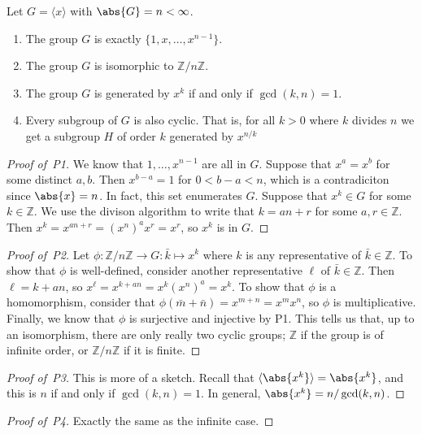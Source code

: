 \begin{proposition}
 Let $G = \langle x \rangle$ with $\abs{G} = n < \infty$.
 \begin{enumerate}[label=P\arabic*.]
 \item The group $G$ is exactly $\{1,x,\dotsc,x^{n-1}\}$.
 \item The group $G$ is isomorphic to $\mathbb{Z}/n\mathbb{Z}$.
 \item The group $G$ is generated by $x^k$ if and only if $\gcd(k,n) = 1$.
 \item Every subgroup of $G$ is also cyclic. That is, for all $k > 0$ where $k$ divides $n$ we get a subgroup $H$ of order $k$ generated by $x^{n/k}$
 \end{enumerate}
\end{proposition}
\begin{proof}[Proof of~P1]
We know that $1,\dotsc,x^{n-1}$ are all in $G$. Suppose that $x^a = x^b$ for some distinct $a,b$. Then $x^{b-a} = 1$ for $0 < b-a < n$, which is a contradiciton since $\abs{x} = n$. In fact, this set enumerates $G$. Suppose that $x^k \in G$ for some $k \in \mathbb{Z}$. We use the divison algorithm to write that $k = an + r$ for some $a,r \in \mathbb{Z}$. Then $x^k = x^{an+r} = (x^n)^ax^r = x^r$, so $x^k$ is in $G$.
\end{proof}
\begin{proof}[Proof of~P2]
Let $\phi : \mathbb{Z}/n\mathbb{Z} \to G : \bar{k} \mapsto x^k$ where $k$ is any representative of $\bar{k} \in \mathbb{Z}$. To show that $\phi$ is well-defined, consider another representative $\ell$ of $\bar{k} \in \mathbb{Z}$. Then $\ell = k + an$, so $x^\ell = x^{k+an} = x^k(x^n)^a = x^k$. To show that $\phi$ is a homomorphism, consider that $\phi(\bar{m}+\bar{n}) = x^{m+n} = x^{m}x^n$, so $\phi$ is multiplicative. Finally, we know that $\phi$ is surjective and injective by P1. This tells us that, up to an isomorphism, there are only really two cyclic groups; $\mathbb{Z}$ if the group is of infinite order, or $\mathbb{Z}/n\mathbb{Z}$ if it is finite.
\end{proof}
\begin{proof}[Proof of~P3]
This is more of a sketch. Recall that $\langle \abs{x^k}\rangle = \abs{x^k}$, and this is $n$ if and only if $\gcd(k,n) = 1$. In general, $\abs{x^k} = n / \gcd(k,n)$.
\end{proof}
\begin{proof}[Proof of~P4]
Exactly the same as the infinite case.
\end{proof}

